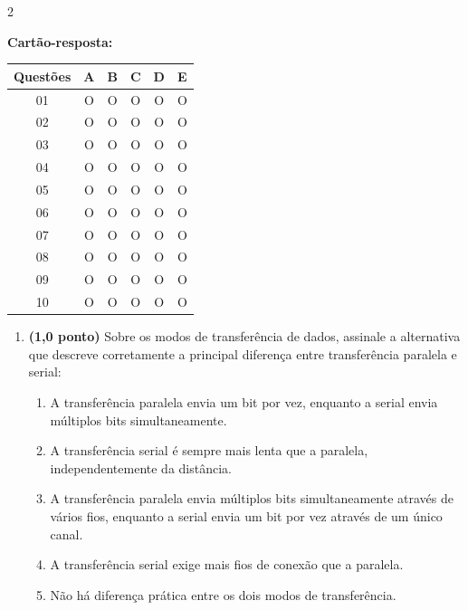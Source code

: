 \documentclass[a4paper,12pt]{article}
\begin{document}
\begin{multicols}{2}
\raggedcolumns

\textbf{Cartão-resposta:}

\vspace{0.2cm}

\begin{tabular}{|c|c|c|c|c|c|}
\hline
\textbf{Questões} & A & B & C & D & E \\
\hline
01 & O & O & O & O & O \\
\hline
02 & O & O & O & O & O \\
\hline
03 & O & O & O & O & O \\
\hline
04 & O & O & O & O & O \\
\hline
05 & O & O & O & O & O \\
\hline
06 & O & O & O & O & O \\
\hline
07 & O & O & O & O & O \\
\hline
08 & O & O & O & O & O \\
\hline
09 & O & O & O & O & O \\
\hline
10 & O & O & O & O & O \\
\hline
\end{tabular}

\vspace{0.7cm}

\begin{enumerate}[leftmargin=*]


\item \textbf{(1,0 ponto)} Sobre os modos de transferência de dados, assinale a alternativa que descreve corretamente a principal diferença entre transferência paralela e serial:

\begin{enumerate}[label=(\Alph*)]
    \item A transferência paralela envia um bit por vez, enquanto a serial envia múltiplos bits simultaneamente.
    \item A transferência serial é sempre mais lenta que a paralela, independentemente da distância.
    \item A transferência paralela envia múltiplos bits simultaneamente através de vários fios, enquanto a serial envia um bit por vez através de um único canal.
    \item A transferência serial exige mais fios de conexão que a paralela.
    \item Não há diferença prática entre os dois modos de transferência.
\end{enumerate}


\end{enumerate}
\end{multicols}
\end{document}
